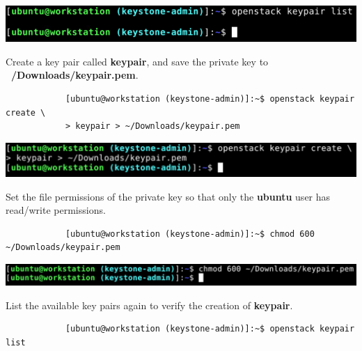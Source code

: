 \documentclass[letterpaper, 12pt]{article}
\begin{document}
\begin{enumerate}
\begin{labstep}
        \begin{center}
            \includegraphics[width=\linewidth]{images/part9/step29.png}
        \end{center}
    \end{labstep}

    \begin{labstep}
        Create a key pair called \textbf{keypair}, and save the private key to \textbf{~/Downloads/keypair.pem}.
        \begin{lstlisting}
            [ubuntu@workstation (keystone-admin)]:~$ openstack keypair create \
            > keypair > ~/Downloads/keypair.pem
        \end{lstlisting}

        \begin{center}
            \includegraphics[width=\linewidth]{images/part9/step30.png}
        \end{center}
    \end{labstep}

    \begin{labstep}
        Set the file permissions of the private key so that only the \textbf{ubuntu} user has read/write permissions.
        \begin{lstlisting}
            [ubuntu@workstation (keystone-admin)]:~$ chmod 600 ~/Downloads/keypair.pem
        \end{lstlisting}

        \begin{center}
            \includegraphics[width=\linewidth]{images/part9/step31.png}
        \end{center}
    \end{labstep}

    \begin{labstep}
        List the available key pairs again to verify the creation of \textbf{keypair}.
        \begin{lstlisting}
            [ubuntu@workstation (keystone-admin)]:~$ openstack keypair list
        \end{lstlisting}


\end{labstep}
\end{enumerate}
\end{document}
